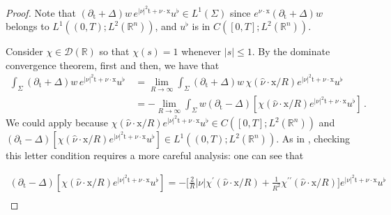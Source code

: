 \documentclass[10pt,a4paper]{amsart}
\newcommand{\R}{\mathbb{R}}
\newcommand{\tm}{\mathrm{t}}
\newcommand{\x}{\mathrm{x}}
\begin{document}
\begin{proof}
Note that
$(\partial_{\tm}+\Delta) w \, e^{|\nu|^2 \tm + \nu \cdot \x} u^\flat \in L^1(\Sigma)$
since $e^{\nu \cdot \x} ( \partial_{\tm}+\Delta) w $ belongs to 
$ L^1((0,T); L^2(\R^n))$, and $ u^\flat $ is in 
$C([0, T] ; L^{2}(\mathbb{R}^{n}))$.

Consider $\chi \in \mathcal{D}(\R)$ so that $\chi(s) = 1$ whenever $|s| \leq 1$.
By the dominate convergence theorem, first and then,  we have that
\begin{align*}
\int_{\Sigma}( \partial_{\tm}+\Delta) w \, e^{|\nu|^2 \tm + \nu \cdot \x} u^\flat \, 
&= \lim_{R\to \infty} \int_{\Sigma}( \partial_{\tm}+\Delta) w \, \chi(\hat \nu \cdot \x/R) e^{|\nu|^2 \tm + \nu \cdot \x} u^\flat \, \\
&= - \lim_{R\to \infty} \int_{\Sigma} w (\partial_{\tm}-\Delta) [\chi(\hat \nu \cdot \x/R) e^{|\nu|^2 \tm + \nu \cdot \x} u^\flat] \, .
\end{align*}
We could apply  because
$\chi(\hat \nu \cdot \x/R) e^{|\nu|^2 \tm + \nu \cdot \x} u^\flat \in C([0,T]; L^2(\R^n))$
and $(\partial_{\tm}-\Delta) [\chi(\hat \nu \cdot \x/R) e^{|\nu|^2 \tm + \nu \cdot \x} u^\flat] \in L^{1}((0, T) ; L^{2}(\mathbb{R}^{n}))$.
As in , checking this letter condition requires a more careful
analysis: one can see that
%
%

%
%
\begin{align*}
(\partial_{\tm}-\Delta) [\chi(\hat \nu \cdot \x/R) e^{|\nu|^2 \tm + \nu \cdot \x} u^\flat] =
- \Big[\frac{2}{R} |\nu| \chi^\prime (\hat \nu \cdot \x/R) + \frac{1}{R^2} \chi^{\prime \prime} (\hat \nu \cdot \x/R) \Big] e^{|\nu|^2 \tm + \nu \cdot \x} u^\flat \\

\end{align*}
\end{proof}
\end{document}
